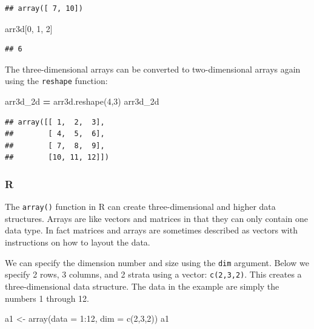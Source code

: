 \documentclass[
]{book}
\newenvironment{Shaded}{\begin{snugshade}}{\end{snugshade}}
\newcommand{\AttributeTok}[1]{\textcolor[rgb]{0.77,0.63,0.00}{#1}}
\newcommand{\DecValTok}[1]{\textcolor[rgb]{0.00,0.00,0.81}{#1}}
\newcommand{\FunctionTok}[1]{\textcolor[rgb]{0.00,0.00,0.00}{#1}}
\newcommand{\NormalTok}[1]{#1}
\newcommand{\OperatorTok}[1]{\textcolor[rgb]{0.81,0.36,0.00}{\textbf{#1}}}
\newcommand{\OtherTok}[1]{\textcolor[rgb]{0.56,0.35,0.01}{#1}}
\newcommand{\SpecialCharTok}[1]{\textcolor[rgb]{0.00,0.00,0.00}{#1}}
\begin{document}
\begin{verbatim}
## array([ 7, 10])
\end{verbatim}

\begin{Shaded}
\begin{Highlighting}[]
\NormalTok{arr3d[}\DecValTok{0}\NormalTok{, }\DecValTok{1}\NormalTok{, }\DecValTok{2}\NormalTok{]}
\end{Highlighting}
\end{Shaded}

\begin{verbatim}
## 6
\end{verbatim}

The three-dimensional arrays can be converted to two-dimensional arrays again using the \texttt{reshape} function:

\begin{Shaded}
\begin{Highlighting}[]
\NormalTok{arr3d\_2d }\OperatorTok{=}\NormalTok{ arr3d.reshape(}\DecValTok{4}\NormalTok{,}\DecValTok{3}\NormalTok{)}
\NormalTok{arr3d\_2d}
\end{Highlighting}
\end{Shaded}

\begin{verbatim}
## array([[ 1,  2,  3],
##        [ 4,  5,  6],
##        [ 7,  8,  9],
##        [10, 11, 12]])
\end{verbatim}

\hypertarget{r-10}{%
\subsubsection*{R}\label{r-10}}

The \texttt{array()} function in R can create three-dimensional and higher data structures. Arrays are like vectors and matrices in that they can only contain one data type. In fact matrices and arrays are sometimes described as vectors with instructions on how to layout the data.

We can specify the dimension number and size using the \texttt{dim} argument. Below we specify 2 rows, 3 columns, and 2 strata using a vector: \texttt{c(2,3,2)}. This creates a three-dimensional data structure. The data in the example are simply the numbers 1 through 12.

\begin{Shaded}
\begin{Highlighting}[]
\NormalTok{a1 }\OtherTok{\textless{}{-}} \FunctionTok{array}\NormalTok{(}\AttributeTok{data =} \DecValTok{1}\SpecialCharTok{:}\DecValTok{12}\NormalTok{, }\AttributeTok{dim =} \FunctionTok{c}\NormalTok{(}\DecValTok{2}\NormalTok{,}\DecValTok{3}\NormalTok{,}\DecValTok{2}\NormalTok{))}
\NormalTok{a1}
\end{Highlighting}
\end{Shaded}
\end{document}
